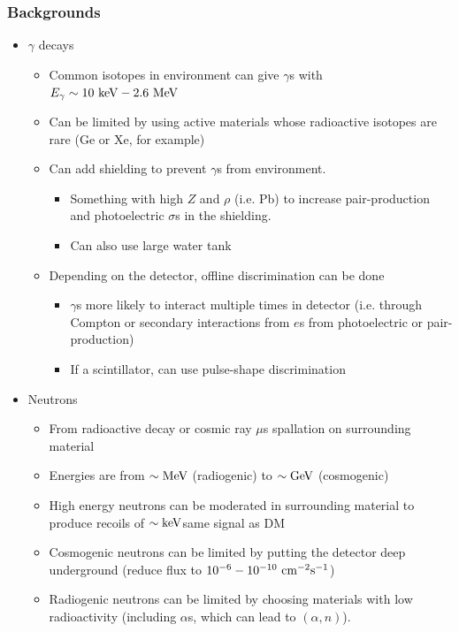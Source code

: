 \subsubsection{Backgrounds}
\begin{itemize}
  \item $\gamma$ decays
  \begin{itemize}
    \item Common isotopes in environment can give $\gamma$s with $E_\gamma \sim 10~\text{keV}-2.6~\text{MeV}$
    \item Can be limited by using active materials whose radioactive isotopes are rare (Ge or Xe, for example)
    \item Can add shielding to prevent $\gamma$s from environment. 
    \begin{itemize}
      \item Something with high $Z$ and $\rho$ (i.e. Pb) to increase pair-production and photoelectric $\sigma$s in the shielding.
      \item Can also use large water tank
    \end{itemize}
    \item Depending on the detector, offline discrimination can be done
    \begin{itemize}
      \item $\gamma$s more likely to interact multiple times in detector (i.e. through Compton or secondary interactions from $e$s from photoelectric or pair-production)
      \item If a scintillator, can use pulse-shape discrimination
    \end{itemize}
  \end{itemize}
  \item Neutrons
  \begin{itemize}
    \item From radioactive decay or cosmic ray $\mu$s spallation on surrounding material
    \item Energies are from $\sim\text{MeV}$ (radiogenic) to $\sim\text{GeV}$ (cosmogenic)
    \item High energy neutrons can be moderated in surrounding material to produce recoils of $\sim \text{keV}$\thus same signal as DM
    \item Cosmogenic neutrons can be limited by putting the detector deep underground (reduce flux to $10^{-6}-10^{-10}~\text{cm}^{-2}\text{s}^{-1}$)
    \item Radiogenic neutrons can be limited by choosing materials with low radioactivity (including $\alpha$s, which can lead to $(\alpha,n)$). 

\end{itemize}
\end{itemize}
